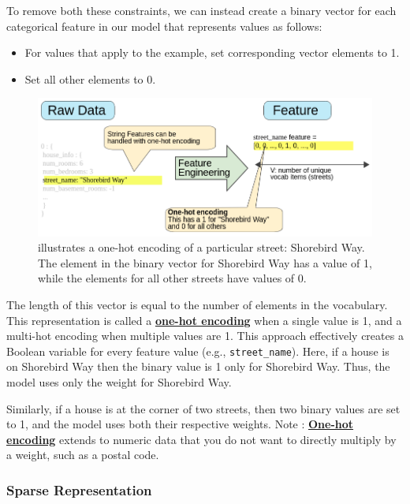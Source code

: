 \documentclass[12pt]{article}
\begin{document}
To remove both these constraints, we can instead create a binary vector for each categorical feature in our model that represents values as follows:
\begin{itemize}
	\item For values that apply to the example, set corresponding vector elements to 1.
	\item Set all other elements to 0.
\end{itemize}
\begin{figure}[h]
	\centering
	\includegraphics[scale = 0.575]{imgs/RawToStringFeature.png}
	\caption{illustrates a one-hot encoding of a particular street: Shorebird Way. The element in the binary vector for Shorebird Way has a value of 1, while the elements for all other streets have values of 0.}
\end{figure}
The length of this vector is equal to the number of elements in the vocabulary. This representation is called a \href{https://developers.google.com/machine-learning/glossary#one-hot_encoding}{\textbf{one-hot encoding}} when a single value is 1, and a multi-hot encoding when multiple values are 1.
This approach effectively creates a Boolean variable for every feature value (e.g., {\tt{street\_name}}). Here, if a house is on Shorebird Way then the binary value is 1 only for Shorebird Way. Thus, the model uses only the weight for Shorebird Way.

Similarly, if a house is at the corner of two streets, then two binary values are set to 1, and the model uses both their respective weights.
Note : \href{https://developers.google.com/machine-learning/glossary#one-hot_encoding}{\textbf{One-hot encoding}} extends to numeric data that you do not want to directly multiply by a weight, such as a postal code.

\subsubsection{Sparse Representation}
\end{document}
